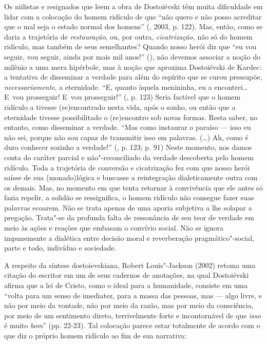 Os niilistas e resignados que leem a obra de Dostoiévski têm muita
dificuldade em lidar com a colocação do homem ridículo de que ``não
quero e não posso acreditar que o mal seja o estado normal dos homens''
(, 2003, p. 122). Mas, então, como se daria a trajetória de
\emph{restauração}, ou, por outra, \emph{cicatrização,} não só do homem
ridículo, mas também de seus semelhantes? Quando nosso herói diz que
``eu vou seguir, vou seguir, ainda por mais mil anos!'' (), não
devemos associar a noção do milênio a uma mera hipérbole, mas à noção
que aproxima Dostoiévski de Kardec: a tentativa de disseminar a verdade
para além do espírito que se curou pressupõe, \emph{necessariamente}, a
eternidade. ``E, quanto àquela menininha, eu a encontrei\ldots E~vou
prosseguir! E~vou prosseguir!'' (, p. 123) Seria factível que o
homem ridículo a tivesse (re)encontrado nesta vida, após o sonho, ou
então que a eternidade tivesse possibilitado o (re)encontro sob novas
formas. Resta saber, no entanto, como disseminar a verdade. ``Mas como
instaurar o paraíso --- isso eu não sei, porque não sou capaz de
transmitir isso em palavras. (\ldots) Ah, como é duro conhecer sozinho a
verdade!'' (, p. 123; p. 91) Neste momento, nos damos conta do
caráter parcial e não"-reconciliado da verdade descoberta pelo homem
ridículo. Toda a trajetória de conversão e cicatrização fez com que
nosso herói saísse de sua (monado)lógica e buscasse a reintegração
dialeticamente outra com os demais. Mas, no momento em que tenta
retornar à convivência que ele antes só fazia repelir, a solidão se
ressignifica, o homem ridículo não consegue fazer suas palavras ecoarem.
Não se trata apenas de uma aporia subjetiva a lhe solapar a pregação.
Trata"-se da profunda falta de ressonância de seu teor de verdade em meio
às ações e reações que embasam o convívio social. Não se ignora
impunemente a dialética entre decisão moral e reverberação
pragmático"-social, parte e todo, indivíduo e sociedade.

A respeito da síntese dostoievskiana, Robert Louis"-Jackson (2002) retoma
uma citação do escritor em um de seus cadernos de anotações, na qual
Dostoiévski afirma que a lei de Cristo, como o ideal para a humanidade,
consiste em uma ``volta para um senso de imediatez, para a massa das
pessoas, mas --- algo livre, e não por meio da vontade, não por meio da
razão, mas por meio da consciência, por meio de um sentimento direto,
terrivelmente forte e incontornável de que \emph{isso} é muito
\emph{bom}'' (pp. 22-23). Tal colocação parece estar totalmente de
acordo com o que diz o próprio homem ridículo ao fim de sua narrativa:

